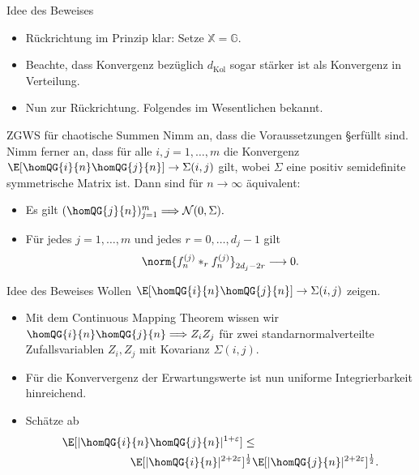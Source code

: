 \begin{frame}{Idee des Beweises}
    \begin{itemize}
    \item Rückrichtung im Prinzip klar: Setze $\mathbb{X} = \mathbb{G}$. 
    \item Beachte, dass Konvergenz bezüglich $d_{\text{Kol}}$ sogar stärker ist als Konvergenz in Verteilung. 
    \end{itemize}
    \pause 
    \begin{itemize}
        \item Nun zur Rückrichtung. Folgendes im Wesentlichen bekannt.
    \end{itemize}
    \begin{theoremblockname}{ZGWS für chaotische Summen}
        Nimm an, dass die Voraussetzungen \S erfüllt sind. Nimm ferner an, dass für alle $i,j = 1, \ldots, m$ die Konvergenz \textcolor{orange}{$\E[\homQG{i}{n}\homQG{j}{n}] \to \Sigma(i,j)$} gilt, wobei $\Sigma$ eine positiv semidefinite symmetrische Matrix ist. Dann sind für $n \to \infty$ äquivalent: 
        \begin{itemize}
            \item[(1)] Es gilt $(\homQG{j}{n})_{j=1}^m \Longrightarrow \mathcal{N}(0, \Sigma).$
            \item[(2)] Für jedes $j =1 ,\ldots, m$ und jedes $r = 0, \ldots, d_j - 1$ gilt \[\norm{f_n^{(j)} *_r f_n^{(j)}}_{2d_j - 2r} \longrightarrow 0.\]
        \end{itemize} 
    \end{theoremblockname}
\end{frame}

\begin{frame}{Idee des Beweises}
    Wollen \textcolor{orange}{$\E[\homQG{i}{n}\homQG{j}{n}] \to \Sigma(i,j)$} zeigen.
    \begin{itemize}
        \item Mit dem Continuous Mapping Theorem wissen wir $\homQG{i}{n}\homQG{j}{n} \Longrightarrow Z_iZ_j$ für zwei standarnormalverteilte Zufallsvariablen $Z_i, Z_j$ mit Kovarianz $\Sigma(i,j)$. 
        \item Für die Konververgenz der Erwartungswerte ist nun uniforme Integrierbarkeit hinreichend. 
        \pause
        \item Schätze ab \begin{align*}
        &\E[|\homQG{i}{n}\homQG{j}{n}|^{1 + \varepsilon}] \leq \\ & \qquad \qquad \qquad \E[|\homQG{i}{n}|^{2 + 2\varepsilon}]^{\frac{1}{2}} \E[|\homQG{j}{n}|^{2 + 2\varepsilon}]^{\frac{1}{2}}.
        \end{align*}
        
    \end{itemize}
\end{frame}


